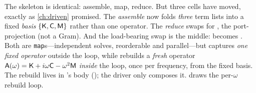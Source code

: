 \noindent The skeleton is identical: assemble, map, reduce. But three cells have
moved, exactly as \cref{ch:driven} promised. The \emph{assemble} now folds
\emph{three} term lists into a fixed \emph{basis} $\{\mathsf{K},\mathsf{C},\mathsf{M}\}$ rather than
one operator. The \emph{reduce} swaps  for
, the port-projection (not a Gram). And the load-bearing
swap is the middle:  becomes . Both are
\texttt{map}s---independent solves, reorderable and parallel---but 
captures \emph{one fixed operator} outside the loop, while 
rebuilds a \emph{fresh} operator $\mathsf{A}(\omega)=\mathsf{K}+i\omega\mathsf{C}-\omega^2\mathsf{M}$
\emph{inside} the loop, once per frequency, from the fixed basis. The rebuild lives in
's body (); the driver only composes it.
 draws the per-$\omega$ rebuild loop.

